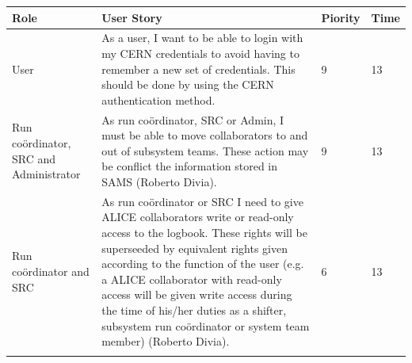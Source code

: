 \documentclass[paper=a4, fontsize=11pt,twoside]{scrartcl}	%
\begin{document}
\begin{longtable}{ | p{2cm} | p{8cm} | p{1.5cm} | l |}
\hline
Role & User Story & Piority & Time \\ \hline
User & As a user, I want to be able to login with my CERN credentials to avoid having to remember a new set of credentials. This should be done by using the CERN authentication method. & 9 & 13 \\ \hline
Run coördinator, SRC and Administrator &  As run coördinator, SRC or Admin, I must be able to move collaborators to and out of subsystem teams. These action may be conflict the information stored in SAMS (Roberto Divia). & 9 & 13 \\ \hline
Run coördinator and SRC &  As run coördinator or SRC I need to give ALICE collaborators write or read-only access to the logbook. These rights will be superseeded by equivalent rights given according to the function of the user (e.g. a ALICE collaborator with read-only access will be given write access during the time of his/her duties as a shifter, subsystem run coördinator or system team member) (Roberto Divia).&6&13 \\ \hline

\label{table:hans}
\end{longtable}



\newpage
\end{document}
